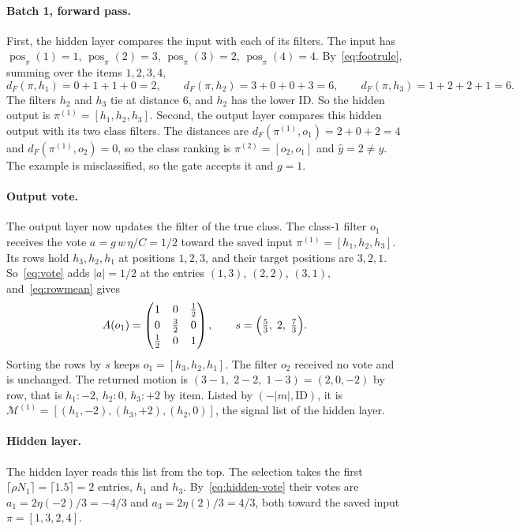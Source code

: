 \paragraph{Batch 1, forward pass.} First, the hidden layer compares the input with each of its filters. The input has $\operatorname{pos}_\pi(1)=1$, $\operatorname{pos}_\pi(2)=3$, $\operatorname{pos}_\pi(3)=2$, $\operatorname{pos}_\pi(4)=4$. By~\eqref{eq:footrule}, summing over the items $1,2,3,4$,
\[
d_F(\pi,h_1)=0+1+1+0=2,\qquad d_F(\pi,h_2)=3+0+0+3=6,\qquad d_F(\pi,h_3)=1+2+2+1=6 .
\]
The filters $h_2$ and $h_3$ tie at distance $6$, and $h_2$ has the lower ID. So the hidden output is $\pi^{(1)}=[h_1,h_2,h_3]$. Second, the output layer compares this hidden output with its two class filters. The distances are $d_F(\pi^{(1)},o_1)=2+0+2=4$ and $d_F(\pi^{(1)},o_2)=0$, so the class ranking is $\pi^{(2)}=[o_2,o_1]$ and $\hat y=2\neq y$. The example is misclassified, so the gate accepts it and $g=1$.

\paragraph{Output vote.} The output layer now updates the filter of the true class. The class-$1$ filter $o_1$ receives the vote $a=g\,w\,\eta/C=1/2$ toward the saved input $\pi^{(1)}=[h_1,h_2,h_3]$. Its rows hold $h_3,h_2,h_1$ at positions $1,2,3$, and their target positions are $3,2,1$. So~\eqref{eq:vote} adds $|a|=1/2$ at the entries $(1,3)$, $(2,2)$, $(3,1)$, and~\eqref{eq:rowmean} gives
\[
A(o_1)=\begin{pmatrix}1&0&\tfrac12\\[2pt]0&\tfrac32&0\\[2pt]\tfrac12&0&1\end{pmatrix},\qquad
s=\Bigl(\tfrac53,\;2,\;\tfrac73\Bigr).
\]
Sorting the rows by $s$ keeps $o_1=[h_3,h_2,h_1]$. The filter $o_2$ received no vote and is unchanged. The returned motion is $(3-1,\;2-2,\;1-3)=(2,0,-2)$ by row, that is $h_1\!:-2$, $h_2\!:0$, $h_3\!:+2$ by item. Listed by $(-|m|,\mathrm{ID})$, it is $\mathcal{M}^{(1)}=[(h_1,-2),(h_3,+2),(h_2,0)]$, the signal list of the hidden layer.

\paragraph{Hidden layer.} The hidden layer reads this list from the top. The selection takes the first $\lceil\rho N_1\rceil=\lceil1.5\rceil=2$ entries, $h_1$ and $h_3$. By~\eqref{eq:hidden-vote} their votes are $a_1=2\eta(-2)/3=-4/3$ and $a_3=2\eta(2)/3=4/3$, both toward the saved input $\pi=[1,3,2,4]$.

